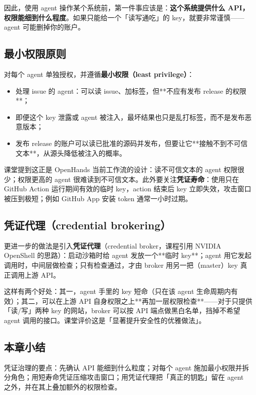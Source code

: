 ﻿\documentclass[a4paper]{article}
\begin{document}
因此，使用 agent 操作某个系统前，第一件事应该是：\textbf{这个系统提供什么 API，权限能细到什么程度}。如果只能给一个「读写通吃」的 key，就要非常谨慎——agent 可能删掉你的账户。

\subsection{最小权限原则}

对每个 agent 单独授权，并遵循\textbf{最小权限（least privilege）}：

\begin{itemize}
\item 处理 issue 的 agent：可以读 issue、加标签，但**不应有发布 release 的权限**；
\item 即便这个 key 泄露或 agent 被注入，最坏结果也只是乱打标签，而不是发布恶意版本；
\item 发布 release 的账户可以读已批准的源码并发布，但要让它**接触不到不可信文本**，从源头降低被注入的概率。
\end{itemize}

课堂提到这正是 OpenHands 当前工作流的设计：读不可信文本的 agent 权限很少；权限更高的 agent 很难读到不可信文本。此外要关注\textbf{凭证寿命}：使用只在 GitHub Action 运行期间有效的临时 key，action 结束后 key 立即失效，攻击窗口被压到极短；例如 GitHub App 安装 token 通常一小时过期。

\subsection{凭证代理（credential brokering）}

更进一步的做法是引入\textbf{凭证代理}（credential broker，课程引用 NVIDIA OpenShell 的思路）：启动沙箱时给 agent 发放一个**临时 key**；agent 用它发起调用时，中间层做检查；只有检查通过，才由 broker 用另一把（master）key 真正调用上游 API。

这样有两个好处：其一，agent 手里的 key 短命（只在该 agent 生命周期内有效）；其二，可以在上游 API 自身权限之上**再加一层权限检查**——对于只提供「读/写」两种 key 的网站，broker 可以按 API 端点做黑白名单，挡掉不希望 agent 调用的接口。课堂评价这是「显著提升安全性的优雅做法」。

\subsection{本章小结}
凭证治理的要点：先确认 API 能细到什么粒度；对每个 agent 施加最小权限并拆分角色；用短寿命凭证压缩攻击窗口；用凭证代理把「真正的钥匙」留在 agent 之外，并在其上叠加额外的权限检查。
\end{document}
